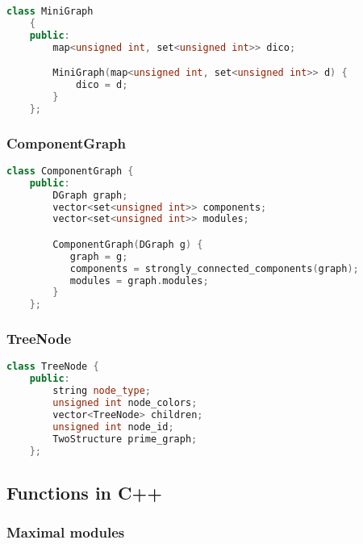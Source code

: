 \begin{lstlisting}[language=C++, style=cpp, caption={Defining the DGraph with C++}, label={lst:cpp-define-d-graph}, firstnumber=1]
    class MiniGraph
    {
    public:
        map<unsigned int, set<unsigned int>> dico;

        MiniGraph(map<unsigned int, set<unsigned int>> d) {
            dico = d;
        }
    };
\end{lstlisting}

\subsubsection{ComponentGraph}

\begin{lstlisting}[language=C++, style=cpp, caption={Defining the ComponentGraph}, label={lst:cpp-define-component-graph}, firstnumber=1]
    class ComponentGraph {
    public:
        DGraph graph;
        vector<set<unsigned int>> components;
        vector<set<unsigned int>> modules;

        ComponentGraph(DGraph g) {
           graph = g;
           components = strongly_connected_components(graph);
           modules = graph.modules;
        }
    };
\end{lstlisting}

\subsubsection{TreeNode}

\begin{lstlisting}[language=C++, style=cpp, caption={Defining the TreeNode}, label={lst:cpp-define-tree-node}, firstnumber=1]
    class TreeNode {
    public:
        string node_type;
        unsigned int node_colors;
        vector<TreeNode> children;
        unsigned int node_id;
        TwoStructure prime_graph;
    };
\end{lstlisting}

\subsection{Functions in C++}\label{subsec:functions-in-c++}

\subsubsection{Maximal modules}

